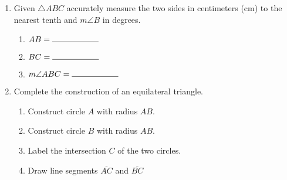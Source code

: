 \documentclass[12pt, oneside]{article}
\begin{document}
\begin{enumerate}
\newpage

  \item Given $\triangle ABC$ accurately measure the two sides in centimeters (cm) to the nearest tenth and $m \angle B$ in degrees.
    \bigskip
  \begin{enumerate}
    \item $AB= \rule{2cm}{0.15mm}$ \bigskip
    \item $BC= \rule{2cm}{0.15mm}$ \bigskip
    \item $m \angle ABC= \rule{2cm}{0.15mm}$
  \end{enumerate}
  \begin{center}
  \end{center}


  \item Complete the construction of an equilateral triangle.
  \begin{enumerate}
    \item Construct circle $A$ with radius $AB$.
    \item Construct circle $B$ with radius $AB$.
    \item Label the intersection $C$ of the two circles.
    \item Draw line segments $\overline{AC}$ and $\overline{BC}$
  \end{enumerate}
  \vspace{4cm}
  \begin{center}
  \end{center}

  \end{enumerate}

  \newpage
\end{document}
